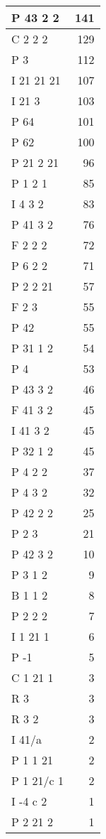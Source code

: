 \documentclass[
]{book}
\theoremstyle{definition}
\theoremstyle{definition}
\theoremstyle{definition}
\theoremstyle{definition}
\theoremstyle{remark}
\begin{document}
\begin{table}
\begin{tabular}{l|r}
\hline
P 43 2 2 & 141\\
\hline
C 2 2 2 & 129\\
\hline
P 3 & 112\\
\hline
I 21 21 21 & 107\\
\hline
I 21 3 & 103\\
\hline
P 64 & 101\\
\hline
P 62 & 100\\
\hline
P 21 2 21 & 96\\
\hline
P 1 2 1 & 85\\
\hline
I 4 3 2 & 83\\
\hline
P 41 3 2 & 76\\
\hline
F 2 2 2 & 72\\
\hline
P 6 2 2 & 71\\
\hline
P 2 2 21 & 57\\
\hline
F 2 3 & 55\\
\hline
P 42 & 55\\
\hline
P 31 1 2 & 54\\
\hline
P 4 & 53\\
\hline
P 43 3 2 & 46\\
\hline
F 41 3 2 & 45\\
\hline
I 41 3 2 & 45\\
\hline
P 32 1 2 & 45\\
\hline
P 4 2 2 & 37\\
\hline
P 4 3 2 & 32\\
\hline
P 42 2 2 & 25\\
\hline
P 2 3 & 21\\
\hline
P 42 3 2 & 10\\
\hline
P 3 1 2 & 9\\
\hline
B 1 1 2 & 8\\
\hline
P 2 2 2 & 7\\
\hline
I 1 21 1 & 6\\
\hline
P -1 & 5\\
\hline
C 1 21 1 & 3\\
\hline
R 3 & 3\\
\hline
R 3 2 & 3\\
\hline
I 41/a & 2\\
\hline
P 1 1 21 & 2\\
\hline
P 1 21/c 1 & 2\\
\hline
I -4 c 2 & 1\\
\hline
P 2 21 2 & 1\\
\hline
\end{tabular}
\end{table}
\end{document}
